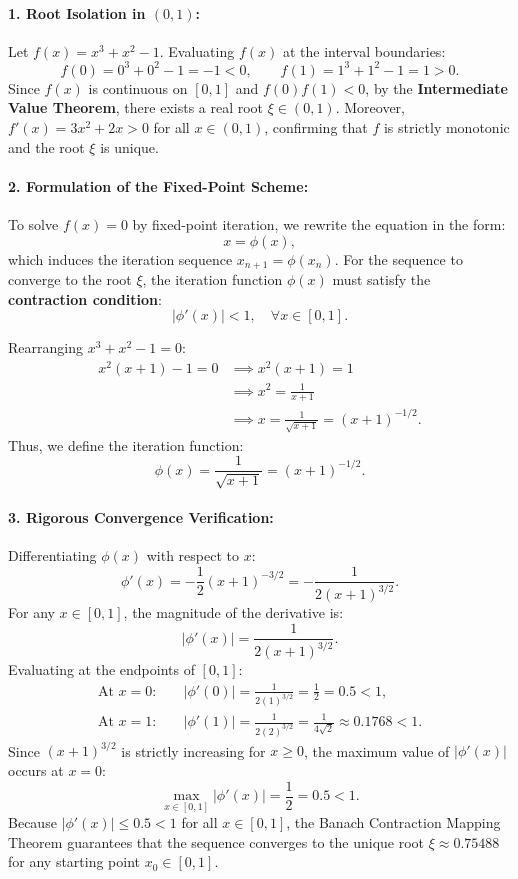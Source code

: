 \documentclass[11pt,a4paper]{article}
\begin{document}
\paragraph{1. Root Isolation in $(0, 1)$:}
Let $f(x) = x^3 + x^2 - 1$.
Evaluating $f(x)$ at the interval boundaries:
\[
f(0) = 0^3 + 0^2 - 1 = -1 < 0, \qquad f(1) = 1^3 + 1^2 - 1 = 1 > 0.
\]
Since $f(x)$ is continuous on $[0, 1]$ and $f(0)f(1) < 0$, by the \textbf{Intermediate Value Theorem}, there exists a real root $\xi \in (0, 1)$. Moreover, $f'(x) = 3x^2 + 2x > 0$ for all $x \in (0, 1)$, confirming that $f$ is strictly monotonic and the root $\xi$ is unique.

\paragraph{2. Formulation of the Fixed-Point Scheme:}
To solve $f(x) = 0$ by fixed-point iteration, we rewrite the equation in the form:
\[
x = \phi(x),
\]
which induces the iteration sequence $x_{n+1} = \phi(x_n)$. For the sequence to converge to the root $\xi$, the iteration function $\phi(x)$ must satisfy the \textbf{contraction condition}:
\[
|\phi'(x)| < 1, \quad \forall x \in [0, 1].
\]

\noindent Rearranging $x^3 + x^2 - 1 = 0$:
\begin{align*}
x^2(x + 1) - 1 = 0 &\implies x^2(x + 1) = 1 \\
&\implies x^2 = \frac{1}{x + 1} \\
&\implies x = \frac{1}{\sqrt{x + 1}} = (x + 1)^{-1/2}.
\end{align*}
Thus, we define the iteration function:
\[
\phi(x) = \frac{1}{\sqrt{x + 1}} = (x + 1)^{-1/2}.
\]

\paragraph{3. Rigorous Convergence Verification:}
Differentiating $\phi(x)$ with respect to $x$:
\[
\phi'(x) = -\frac{1}{2}(x + 1)^{-3/2} = -\frac{1}{2(x + 1)^{3/2}}.
\]
For any $x \in [0, 1]$, the magnitude of the derivative is:
\[
|\phi'(x)| = \frac{1}{2(x + 1)^{3/2}}.
\]
Evaluating at the endpoints of $[0, 1]$:
\begin{align*}
\text{At } x = 0: \quad & |\phi'(0)| = \frac{1}{2(1)^{3/2}} = \frac{1}{2} = 0.5 < 1, \\
\text{At } x = 1: \quad & |\phi'(1)| = \frac{1}{2(2)^{3/2}} = \frac{1}{4\sqrt{2}} \approx 0.1768 < 1.
\end{align*}
Since $(x + 1)^{3/2}$ is strictly increasing for $x \ge 0$, the maximum value of $|\phi'(x)|$ occurs at $x = 0$:
\[
\max_{x \in [0, 1]} |\phi'(x)| = \frac{1}{2} = 0.5 < 1.
\]
Because $|\phi'(x)| \le 0.5 < 1$ for all $x \in [0, 1]$, the Banach Contraction Mapping Theorem guarantees that the sequence converges to the unique root $\xi \approx 0.75488$ for any starting point $x_0 \in [0, 1]$.
\end{document}
